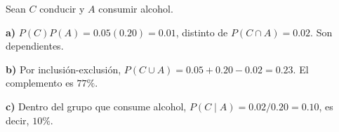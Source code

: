 Sean $C$ conducir y $A$ consumir alcohol.

\textbf{a)} $P(C)P(A)=0.05(0.20)=0.01$, distinto de
$P(C\cap A)=0.02$. Son dependientes.

\textbf{b)} Por inclusión-exclusión,
$P(C\cup A)=0.05+0.20-0.02=0.23$.
El complemento es $\boxed{77\%}$.

\textbf{c)} Dentro del grupo que consume alcohol,
$P(C\mid A)=0.02/0.20=0.10$, es decir, $\boxed{10\%}$.
